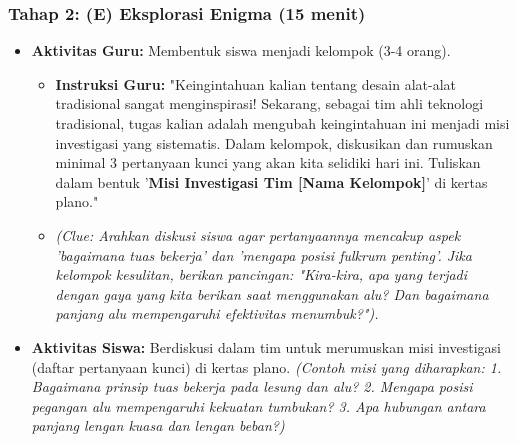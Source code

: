 \documentclass[a4paper,12pt]{article}
\begin{document}
\subsubsection{Tahap 2: (E) Eksplorasi Enigma (15 menit)}
\begin{itemize}
\item \textbf{Aktivitas Guru:} Membentuk siswa menjadi kelompok (3-4 orang).
    \begin{itemize}
    \item \textbf{Instruksi Guru:} "Keingintahuan kalian tentang desain alat-alat tradisional sangat menginspirasi! Sekarang, sebagai tim ahli teknologi tradisional, tugas kalian adalah mengubah keingintahuan ini menjadi misi investigasi yang sistematis. Dalam kelompok, diskusikan dan rumuskan minimal 3 pertanyaan kunci yang akan kita selidiki hari ini. Tuliskan dalam bentuk '\textbf{Misi Investigasi Tim [Nama Kelompok]}' di kertas plano."
    \item \textit{(Clue: Arahkan diskusi siswa agar pertanyaannya mencakup aspek 'bagaimana tuas bekerja' dan 'mengapa posisi fulkrum penting'. Jika kelompok kesulitan, berikan pancingan: "Kira-kira, apa yang terjadi dengan gaya yang kita berikan saat menggunakan alu? Dan bagaimana panjang alu mempengaruhi efektivitas menumbuk?").}
    \end{itemize}
\item \textbf{Aktivitas Siswa:} Berdiskusi dalam tim untuk merumuskan misi investigasi (daftar pertanyaan kunci) di kertas plano. \textit{(Contoh misi yang diharapkan: 1. Bagaimana prinsip tuas bekerja pada lesung dan alu? 2. Mengapa posisi pegangan alu mempengaruhi kekuatan tumbukan? 3. Apa hubungan antara panjang lengan kuasa dan lengan beban?)}
\end{itemize}
\end{document}
